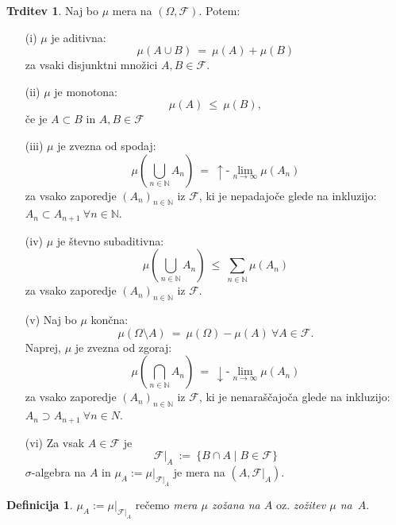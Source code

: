\documentclass[11pt]{article}
\newcommand{\N}{\mathbb{N}}
\newcommand{\F}{\mathcal{F}}
\newcommand{\set}[1]{\{#1\}}
\newcommand{\oklepaj}[1]{\left(#1\right)}
\newcommand{\1}{\mathbbm{1}}
\theoremstyle{definition}
\newtheorem{definicija}{Definicija}[section]
\theoremstyle{definition}
\newtheorem{trditev}{Trditev}[section]
\theoremstyle{definition}
\theoremstyle{definition}
\begin{document}
\begin{trditev}

Naj bo $\mu$ mera na $(\Omega, \F)$. Potem:
\begin{enumerate}

\item[(i)] $\mu$ je aditivna: 
$$\mu(A \cup B) ~=~ \mu(A) + \mu(B)$$
za vsaki disjunktni množici $A,B \in \F$.

\item[(ii)] $\mu$ je monotona:
$$\mu(A) ~\leq~ \mu(B),$$
če je $A \subset B$ in $A,B \in \F$

\item[(iii)] $\mu$ je zvezna od spodaj:
$$\mu\oklepaj{\bigcup_{n \in \N} A_n} ~=~ {\uparrow\text{-}\lim_{n \rightarrow \infty}} \mu(A_n)$$
za vsako zaporedje $(A_n)_{n \in \N}$ iz $\F$, ki je nepadajoče glede na inkluzijo: $A_n \subset A_{n+1} ~\forall n \in \N$.

\item[(iv)] $\mu$ je števno subaditivna:
$$\mu\oklepaj{\bigcup_{n \in \N} A_n} ~\leq~ \sum_{n \in \N} \mu(A_n)$$
za vsako zaporedje $(A_n)_{n \in \N}$ iz $\F$.

\item[(v)] Naj bo $\mu$ končna:
$$\mu(\Omega \setminus A) ~=~ \mu(\Omega) - \mu(A) ~\forall A \in \F.$$
Naprej, $\mu$ je zvezna od zgoraj:
$$\mu\oklepaj{\bigcap_{n \in \N} A_n} ~=~ {\downarrow\text{-}\lim_{n \rightarrow \infty}}\mu(A_n)$$
za vsako zaporedje $(A_n)_{n \in \N}$ iz $\F$, ki je nenaraščajoča glede na inkluzijo: $A_n \supset A_{n+1} ~\forall n \in N$.

\item[(vi)] Za vsak $A \in \F$ je
$$\F \big|_A ~:=~ \set{B \cap A \mid B \in \F}$$
$\sigma$-algebra na $A$ in $\mu_A := \mu\big|_{\F\big|_A}$ je mera na $(A, \F\big|_A)$. 

\end{enumerate}

\end{trditev}
\vspace{0.5cm}

\begin{definicija}

$\mu_A := \mu\big|_{\F\big|_A}$ rečemo \textit{mera $\mu$ zožana na $A$} oz. \textit{zožitev $\mu$ \hbox{na $A$}}.

\end{definicija}
\vspace{0.5cm}

\end{document}
